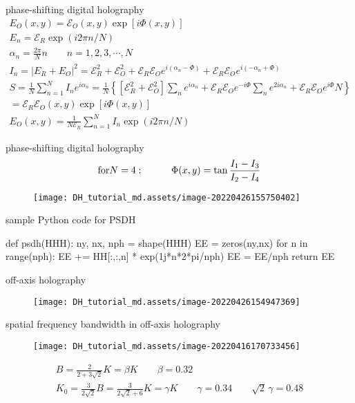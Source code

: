 \documentclass[t, aspectratio=169]{beamer}
\begin{document}
\begin{frame}{phase-shifting digital holography}
	\begin{gather*}
E_O(x,y) = \mathcal{E}_O(x,y)\exp[i\Phi(x,y)] \\
E_n = \mathcal{E}_R \exp(i2\pi n/N) \\
\alpha_n = \frac{2\pi}{N}n \qquad n=1,2,3,\cdots,N \\
I_n = |E_R + E_O|^2 = \mathcal{E}_R^2 + \mathcal{E}_O^2 + \mathcal{E}_R\mathcal{E}_O e^{i(\alpha_n-\Phi)} + \mathcal{E}_R\mathcal{E}_O e^{i(-\alpha_n+\Phi)} \\
S=\frac{1}{N}\sum_{n=1}^N I_n e^{i\alpha_n} = \frac{1}{N}\left\{\left[\mathcal{E}_R^2 + \mathcal{E}_O^2 \right]\sum_n e^{i\alpha_n} + \mathcal{E}_R\mathcal{E}_O e^{-i\Phi}\sum_n e^{2i\alpha_n} + \mathcal{E}_R\mathcal{E}_O e^{i\Phi}N \right\} \\
= \mathcal{E}_R\mathcal{E}_O(x,y)\exp[i\Phi(x,y)] \\
E_O(x,y) = \frac{1}{N\mathcal E_R}\sum_{n=1}^N I_n \exp(i2\pi n/N)
	\end{gather*}
\end{frame}


\begin{frame}{phase-shifting digital holography}
\[ \textrm{for} N=4:\hspace{10 mm} \Phi(x,y) = \tan\frac{I_1 - I_3}{I_2 - I_4} \]	
	\begin{figure}
		\texttt{[image: DH\_tutorial\_md.assets/image-20220426155750402]}
	\end{figure}	
\end{frame}


\begin{frame}[fragile]{sample Python code for PSDH}
	\begin{semiverbatim}
def psdh(HHH):
	ny, nx, nph = shape(HHH)
	EE = zeros(ny,nx)
	for n in range(nph):
		EE += HH[:,:,n] * exp(1j*n*2*pi/nph)
    EE = EE/nph
    return EE
	\end{semiverbatim}
\end{frame}


\begin{frame}{off-axis holography}
	\begin{figure}
		\texttt{[image: DH\_tutorial\_md.assets/image-20220426154947369]}
	\end{figure}
\end{frame}


\begin{frame}{spatial frequency bandwidth in off-axis holography}
	\begin{figure}
		\texttt{[image: DH\_tutorial\_md.assets/image-20220416170733456]}
	\end{figure}
	\begin{gather*}
B = \frac{2}{2+3\sqrt{2}}K = \beta K \qquad \beta=0.32 \\
K_0 = \frac{3}{2\sqrt{2}}B = \frac{3}{2\sqrt{2}+6} K = \gamma K \qquad \gamma=0.34 \qquad \sqrt{2}\,\gamma = 0.48 
	\end{gather*}
\end{frame}
\end{document}
